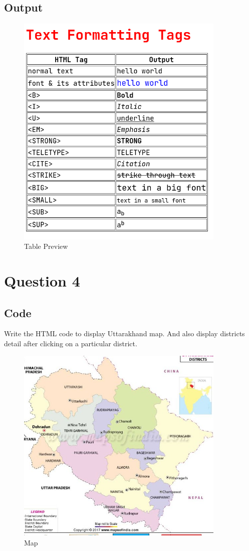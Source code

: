 \documentclass{extarticle}
\begin{document}
\subsection*{Output}
\begin{figure}[H]
    \caption{Table Preview}
    \centering
    \includegraphics[width=10cm]{4/4.png}
\end{figure}

\newpage
\section*{Question 4}

\subsection*{Code}

Write the HTML code to display Uttarakhand map.
And also display districts detail after clicking on a
particular district.

\begin{figure}[H]
    \caption{Map}
    \centering
    \includegraphics[width=10cm]{./img/d.jpg}
\end{figure}
\end{document}
